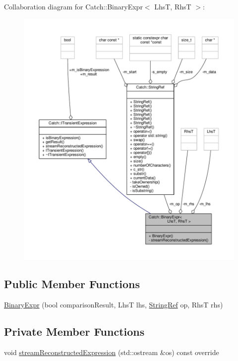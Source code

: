 Collaboration diagram for Catch\-:\-:Binary\-Expr$<$ Lhs\-T, Rhs\-T $>$\-:
\nopagebreak
\begin{figure}[H]
\begin{center}
\leavevmode
\includegraphics[width=350pt]{class_catch_1_1_binary_expr__coll__graph}
\end{center}
\end{figure}
\subsection*{Public Member Functions}
\begin{DoxyCompactItemize}
\item 
\hyperlink{class_catch_1_1_binary_expr_a657d66346aef97a760c22776fe6008b6}{Binary\-Expr} (bool comparison\-Result, Lhs\-T lhs, \hyperlink{class_catch_1_1_string_ref}{String\-Ref} op, Rhs\-T rhs)
\end{DoxyCompactItemize}
\subsection*{Private Member Functions}
\begin{DoxyCompactItemize}
\item 
void \hyperlink{class_catch_1_1_binary_expr_af998022712d4bd3e4fc7ab9b8a38b445}{stream\-Reconstructed\-Expression} (std\-::ostream \&os) const override
\end{DoxyCompactItemize}
